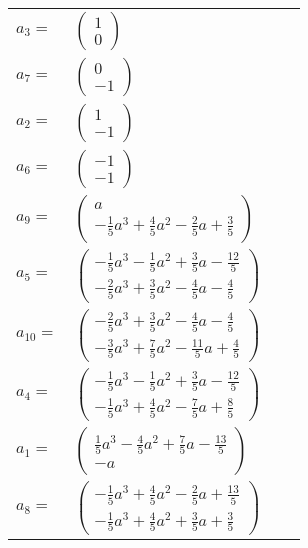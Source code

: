\documentclass[1p]{elsarticle_modified}
\theoremstyle{definition}
\begin{document}
\begin{tabular}{m{7pt} m{180pt} m{7pt} m{180pt} }
\flushright $a_{3}=$&$\begin{pmatrix}1\\0\end{pmatrix}$ \\
\flushright $a_{7}=$&$\begin{pmatrix}0\\-1\end{pmatrix}$ \\
\flushright $a_{2}=$&$\begin{pmatrix}1\\-1\end{pmatrix}$ \\
\flushright $a_{6}=$&$\begin{pmatrix}-1\\-1\end{pmatrix}$ \\
\flushright $a_{9}=$&$\begin{pmatrix}a\\-\frac{1}{5} a^3+\frac{4}{5} a^2-\frac{2}{5} a+\frac{3}{5}\end{pmatrix}$ \\
\flushright $a_{5}=$&$\begin{pmatrix}-\frac{1}{5} a^3-\frac{1}{5} a^2+\frac{3}{5} a-\frac{12}{5}\\-\frac{2}{5} a^3+\frac{3}{5} a^2-\frac{4}{5} a-\frac{4}{5}\end{pmatrix}$ \\
\flushright $a_{10}=$&$\begin{pmatrix}-\frac{2}{5} a^3+\frac{3}{5} a^2-\frac{4}{5} a-\frac{4}{5}\\-\frac{3}{5} a^3+\frac{7}{5} a^2-\frac{11}{5} a+\frac{4}{5}\end{pmatrix}$ \\
\flushright $a_{4}=$&$\begin{pmatrix}-\frac{1}{5} a^3-\frac{1}{5} a^2+\frac{3}{5} a-\frac{12}{5}\\-\frac{1}{5} a^3+\frac{4}{5} a^2-\frac{7}{5} a+\frac{8}{5}\end{pmatrix}$ \\
\flushright $a_{1}=$&$\begin{pmatrix}\frac{1}{5} a^3-\frac{4}{5} a^2+\frac{7}{5} a-\frac{13}{5}\\- a\end{pmatrix}$ \\
\flushright $a_{8}=$&$\begin{pmatrix}-\frac{1}{5} a^3+\frac{4}{5} a^2-\frac{2}{5} a+\frac{13}{5}\\-\frac{1}{5} a^3+\frac{4}{5} a^2+\frac{3}{5} a+\frac{3}{5}\end{pmatrix}$ \\

\end{tabular}
\end{document}
